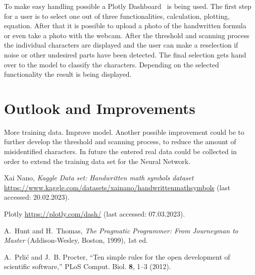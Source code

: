 \documentclass[@CLASSOPTIONS@]{tumarticle}
\begin{document}
To make easy handling possible a Plotly Dashboard~\cite{plotly} is being used.
The first step for a user is to select one out of three functionalities,
calculation, plotting, equation.
After that it is possible to upload a photo of the handwritten formula or even take a photo
with the webcam.
After the threshold and scanning process the individual characters are displayed
and the user can make a reselection if noise or other undesired parts have been detected.
The final selection gets hand over to the model to classify the characters.
Depending on the selected functionality the result is being displayed.

\section{Outlook and Improvements}

More training data.
Improve model.
Another possible improvement could be to further develop the threshold and scanning process,
to reduce the amount of misidentified characters.
In future the entered real data could be collected in order to extend the training data set for the
Neural Network.

\begin{thebibliography}{10}
  \newcommand{\enquote}[1]{``#1''}

  Xai Nano, \emph{Kaggle Data set: Handwritten math symbols dataset}
  \url{https://www.kaggle.com/datasets/xainano/handwrittenmathsymbols}
  (last accessed: 20.02.2023).

  Plotly \url{https://plotly.com/dash/}
  (last accessed: 07.03.2023).

  A.~Hunt and H.~Thomas, \emph{The Pragmatic Programmer: From Journeyman to
    Master} (Addison-Wesley, Boston, 1999), 1st ed.

  A.~Prli{\'c} and J.~B. Procter, \enquote{Ten simple rules for the open
    development of scientific software,} PLoS Comput. Biol. \textbf{8}, 1--3
  (2012).

\end{thebibliography}
\end{document}
